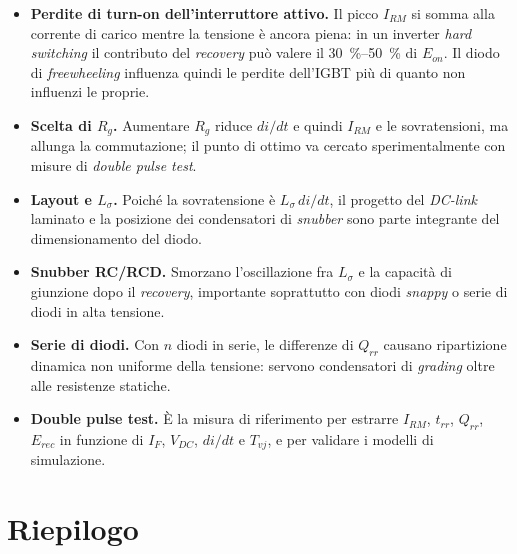 \documentclass[11pt,a4paper]{article}
\begin{document}
\begin{itemize}
\item \textbf{Perdite di turn-on dell'interruttore attivo.} Il picco $I_{RM}$
si somma alla corrente di carico mentre la tensione è ancora piena: in un
inverter \emph{hard switching} il contributo del \emph{recovery} può valere
il \SIrange{30}{50}{\percent} di $E_{on}$. Il diodo di \emph{freewheeling}
influenza quindi le perdite dell'IGBT più di quanto non influenzi le proprie.

\item \textbf{Scelta di $R_g$.} Aumentare $R_g$ riduce $di/dt$ e quindi $I_{RM}$
e le sovratensioni, ma allunga la commutazione; il punto di ottimo va cercato
sperimentalmente con misure di \emph{double pulse test}.

\item \textbf{Layout e $L_\sigma$.} Poiché la sovratensione è
$L_\sigma\,di/dt$, il progetto del \emph{DC-link} laminato e la
posizione dei condensatori di \emph{snubber} sono parte integrante del
dimensionamento del diodo.

\item \textbf{Snubber RC/RCD.} Smorzano l'oscillazione fra $L_\sigma$ e la
capacità di giunzione dopo il \emph{recovery}, importante soprattutto con diodi
\emph{snappy} o serie di diodi in alta tensione.

\item \textbf{Serie di diodi.} Con $n$ diodi in serie, le differenze di
$Q_{rr}$ causano ripartizione dinamica non uniforme della tensione: servono
condensatori di \emph{grading} oltre alle resistenze statiche.

\item \textbf{Double pulse test.} È la misura di riferimento per estrarre
$I_{RM}$, $t_{rr}$, $Q_{rr}$, $E_{rec}$ in funzione di $I_F$, $V_{DC}$, $di/dt$
e $T_{vj}$, e per validare i modelli di simulazione.
\end{itemize}

\section{Riepilogo}
\end{document}

